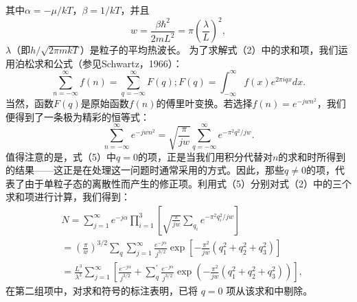 其中\(\alpha = -\mu/kT\)，\(\beta = 1/kT\)，并且
\begin{equation}\tag{17.6.4}\label{eq:17.6.4}
w = \frac { \beta \hbar ^{2} } { 2 m L ^{2} } = \pi \left( \frac { \lambda } { L } \right) ^{2} ,
\end{equation}
\(\lambda\)（即\(h/\sqrt{2\pi m k T}\)）是粒子的平均热波长。
为了求解式（2）中的求和项，我们运用泊松求和公式（参见Schwartz，1966）：
\begin{equation}\tag{17.6.5}\label{eq:17.6.5}
\sum _ { n = - \infty } ^{\infty} f ( n ) = \sum _ { q = - \infty } ^{\infty} F ( q ) ;  F ( q ) = \int _ { - \infty } ^{\infty} f ( x ) e ^{2 \pi i q x} d x .
\end{equation}
当然，函数\(F(q)\)是原始函数\(f(n)\)的傅里叶变换。若选择\(f(n) = e^{-jwn^2}\)，我们便得到了一条极为精彩的恒等式：
\begin{equation}\tag{17.6.6}\label{eq:17.6.6}
\sum _ { n = - \infty } ^{\infty} e ^{- j w n ^ { 2} } = \sqrt { \frac { \pi } { j w } } \sum _ { q = - \infty } ^{\infty} e ^{- \pi ^ { 2} q ^{2} / j w } .
\end{equation}
值得注意的是，式（5）中\(q=0\)的项，正是当我们用积分代替对\(n\)的求和时所得到的结果——这正是在处理这一问题时通常采用的方式。因此，那些\(q\neq0\)的项，代表了由于单粒子态的离散性而产生的修正项。利用式（5）分别对式（2）中的三个求和项进行计算，我们得到：
\begin{equation}\tag{17.6.7}\label{eq:17.6.7}
\begin{array}{rl} & { N = \displaystyle \sum _ { j = 1 } ^{\infty} e ^{- j \alpha} \displaystyle \prod _ { i = 1 } ^{3} \left[ \sqrt { \frac { \pi } { j w } } \sum _ { q _ { i } } e ^{- \pi ^ { 2} q _ { i } ^{2} / j w } \right] } \\& { = \left( \frac { \pi } { w } \right) ^{3 / 2} \displaystyle \sum _ { q } \displaystyle \sum _ { j = 1 } ^{\infty} \frac { e ^{- j \alpha} } { j ^{3 / 2} } \exp \left[ - \frac { \pi ^{2} } { j w } \left( q _ { 1 } ^{2} + q _ { 2 } ^{2} + q _ { 3 } ^{2} \right) \right] } \\& { = \displaystyle \frac { L ^{3} } { \lambda ^{3} } \displaystyle \sum _ { j = 1 } ^{\infty} \left[ \frac { e ^{- j \alpha} } { j ^{3 / 2} } + \sum _ { q } ^{\prime} \frac { e ^{- j \alpha} } { j ^{3 / 2} } \exp \left( - \frac { \pi ^{2} } { j w } \left( q _ { 1 } ^{2} + q _ { 2 } ^{2} + q _ { 3 } ^{2} \right) \right) \right] , } \end{array}
\end{equation}
在第二组项中，对求和符号的标注表明，已将 \(q=0\) 项从该求和中剔除。
